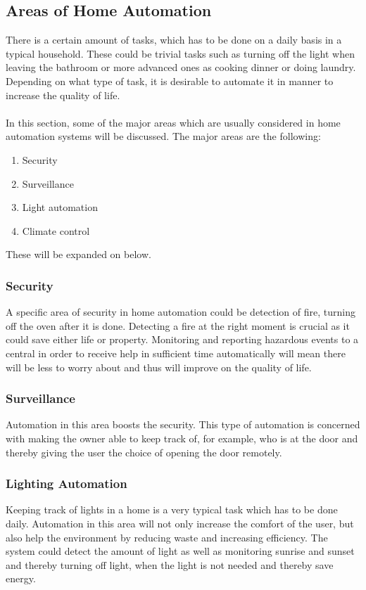 \subsection{Areas of Home Automation}
\label{sec:Areas of Home Automation}
There is a certain amount of tasks, which has to be done on a daily basis in a typical household. These could be trivial tasks such as turning off the light when leaving the bathroom or more advanced ones as cooking dinner or doing laundry. Depending on what type of task, it is desirable to automate it in manner to increase the quality of life.
\\\\
In this section, some of the major areas which are usually considered in home automation systems will be discussed.
The major areas are the following:
\begin{enumerate}
  \item Security
  \item Surveillance
  \item Light automation
  \item Climate control
\end{enumerate}
These will be expanded on below.

\subsubsection{Security}
\label{sub:Security}
A specific area of security in home automation could be detection of fire, turning off the oven after it is done. Detecting a fire at the right moment is crucial as it could save either life or property. Monitoring and reporting hazardous events to a central in order to receive help in sufficient time automatically will mean there will be less to worry about and thus will improve on the quality of life.

\subsubsection{Surveillance}
\label{sub:Surveillance}
Automation in this area boosts the security. This type of automation is concerned with making the owner able to keep track of, for example, who is at the door and thereby giving the user the choice of opening the door remotely.

\subsubsection{Lighting Automation}
\label{sub:Lighting Automation}
Keeping track of lights in a home is a very typical task which has to be done daily. Automation in this area will not only increase the comfort of the user, but also help the environment by reducing waste and increasing efficiency. The system could detect the amount of light as well as monitoring sunrise and sunset and thereby turning off light, when the light is not needed and thereby save energy.

